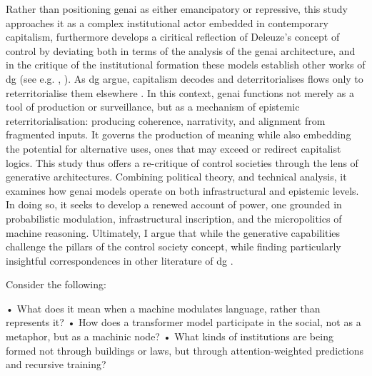 Rather than positioning \gls{genai} as either emancipatory or repressive, this study approaches it as a complex institutional actor embedded in contemporary capitalism, furthermore develops a ciritical reflection of Deleuze's concept of control by deviating both in terms of the analysis of the \gls{genai} architecture, and in the critique of the institutional formation these models establish other works of \gls{dg}  (see e.g. \cite{deleuze1983}, \cite{deleuze1987}). As \gls{dg} argue, capitalism decodes and deterritorialises flows only to reterritorialise them elsewhere \parencite{deleuze1983}. In this context, \gls{genai} functions not merely as a tool of production or surveillance, but as a mechanism of epistemic reterritorialisation: producing coherence, narrativity, and alignment from fragmented inputs. It governs the production of meaning while also embedding the potential for alternative uses, ones that may exceed or redirect capitalist logics. This study thus offers a re-critique of control societies through the lens of generative architectures. Combining political theory, and technical analysis, it examines how \gls{genai} models operate on both infrastructural and epistemic levels. In doing so, it seeks to develop a renewed account of power, one grounded in probabilistic modulation, infrastructural inscription, and the micropolitics of machine reasoning. Ultimately, I argue that while the generative capabilities challenge the pillars of the control society concept, while finding particularly insightful correspondences in other literature of \gls{dg} .


\begin{orangebox}
	Consider the following:


	•	What does it mean when a machine modulates language, rather than represents it?
	•	How does a transformer model participate in the social, not as a metaphor, but as a machinic node?
	•	What kinds of institutions are being formed not through buildings or laws, but through attention-weighted predictions and recursive training?
\end{orangebox}


